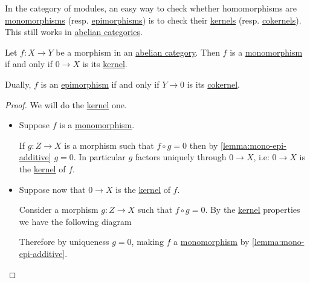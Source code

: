 \documentclass[../../main]{subfiles}
\begin{document}
In the category of modules, an easy way to check whether homomorphisms are \hyperref[def:mono-epi-morphism]{monomorphisms} (resp. \hyperref[def:mono-epi-morphism]{epimorphisms}) is to check their \hyperref[def:categorical-kernel]{kernels} (resp. \hyperref[def:categorical-kernel]{cokernels}).
This still works in \hyperref[def:abelian-category]{abelian categories}.
\begin{lemma}\label{lemma:partial-sequence-abelian}
  Let \(f\colon X \to Y\) be a morphism in an \hyperref[def:abelian-category]{abelian category}. Then \(f\) is a \hyperref[def:mono-epi-morphism]{monomorphism} if and only if \(0 \to X\) is its \hyperref[def:categorical-kernel]{kernel}.

  Dually, \(f\) is an \hyperref[def:mono-epi-morphism]{epimorphism} if and only if \(Y \to 0\) is its \hyperref[def:categorical-cokernel]{cokernel}.
\end{lemma}
\begin{proof}
  We will do the \hyperref[def:categorical-kernel]{kernel} one.
  \begin{itemize}
    \item[\(\implies\)] Suppose \(f\) is a \hyperref[def:mono-epi-morphism]{monomorphism}.

          If \(g\colon Z \to X\) is a morphism such that \(f \circ g = 0\) then by \autoref{lemma:mono-epi-additive} \(g = 0\).
          In particular \(g\) factors uniquely through \(0 \to X\), i.e: \(0 \to X\) is the \hyperref[def:categorical-kernel]{kernel} of \(f\).
    \item[\(\impliedby\)] Suppose now that \(0 \to X\) is the \hyperref[def:categorical-kernel]{kernel} of \(f\).

          Consider a morphism \(g\colon Z \to X\) such that \(f \circ g = 0\).
          By the \hyperref[def:categorical-kernel]{kernel} properties we have the following diagram
          \begin{center}
          \end{center}
          Therefore by uniqueness \(g = 0\), making \(f\) a \hyperref[def:mono-epi-morphism]{monomorphism} by \autoref{lemma:mono-epi-additive}. \qedhere
  \end{itemize}
\end{proof}
\end{document}
